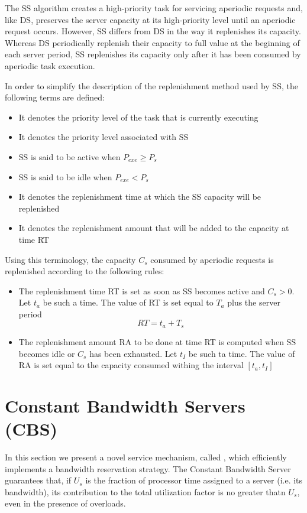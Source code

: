The SS algorithm creates a high-priority task for servicing aperiodic requests and, like DS, preserves the server capacity at its high-priority level until an aperiodic request occurs. However, SS differs from DS in the way it replenishes its capacity. Whereas DS periodically replenish their capacity to full value at the beginning of each server period, SS replenishes its capacity only after it has been consumed by aperiodic task execution.

In order to simplify the description of the replenishment method used by SS, the following terms are defined:
\begin{itemize}
    \item{ It denotes the priority level of the task that is currently executing}
    \item{ It denotes the priority level associated with SS}
    \item{SS is said to be active when $P_{exe}\ge P_s$}
    \item{SS is said to be idle when $P_{exe} < P_s$}
    \item{ It denotes the replenishment time at which the SS capacity will be replenished}
    \item{It denotes the replenishment amount that will be added to the capacity at time RT}
\end{itemize}

Using this terminology, the capacity $C_s$ consumed by aperiodic requests is replenished according to the following rules:
\begin{itemize}
    \item The replenishment time RT is set as soon as SS becomes active and $C_s > 0$. Let $t_a$ be such a time. The value of RT is set equal to $T_a$ plus the server period
     \[RT = t_a + T_s\]
    \item The replenishment amount RA to be done at time RT is computed when SS becomes idle or $C_s$ has been exhausted. Let $t_I$ be such ta time. The value of RA is set equal to the capacity consumed withing the interval $[t_a, t_I]$ 
\end{itemize}

\section{Constant Bandwidth Servers (CBS)}
In this section we present a novel service mechanism, called , which efficiently implements a bandwidth reservation strategy. The Constant Bandwidth Server guarantees that, if $U_s$ is the fraction of processor time assigned to a server (i.e. its bandwidth), its contribution to the total utilization factor is no greater thatn $U_s$, even in the presence of overloads. 

